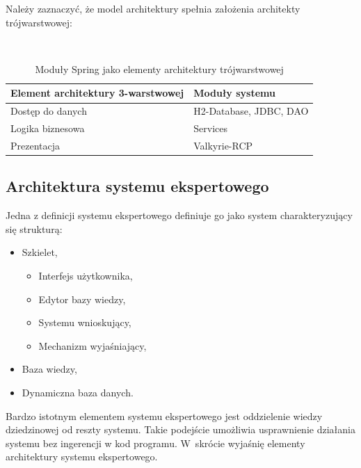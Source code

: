 Należy zaznaczyć, że model architektury spełnia założenia architekty trójwarstwowej:
\begin{table}[h]
 \caption{Moduły Spring jako elementy architektury trójwarstwowej}
 \small\tt
 \centering
 \vspace{0in}
 \begin{tabular}{|l|l|}
 \hline
 \textbf{Element architektury 3-warstwowej} & \textbf{Moduły systemu} \\ 
 \hline
 Dostęp do danych & H2-Database, JDBC, DAO \\
 \hline
 Logika biznesowa & Services \\
 \hline
 Prezentacja & Valkyrie-RCP \\
 \hline
 \end{tabular}
\end{table}

\subsection{Architektura systemu ekspertowego}
\label{sec:architekturaSystemuEkspertowego}
Jedna z definicji systemu ekspertowego definiuje go jako system charakteryzujący się strukturą\cite{goluchowski_eskpertowe}:
\begin{itemize}
 \item 	Szkielet,
       \begin{itemize}
	 \item Interfejs użytkownika,
	 \item Edytor bazy wiedzy,
	 \item Systemu wnioskujący,
	 \item Mechanizm wyjaśniający,
       \end{itemize}
 \item Baza wiedzy,
 \item Dynamiczna baza danych.
\end{itemize}

Bardzo istotnym elementem systemu ekspertowego jest oddzielenie wiedzy dziedzinowej od reszty systemu. Takie podejście umożliwia usprawnienie działania systemu bez ingerencji w kod programu. W~skrócie wyjaśnię elementy architektury systemu ekspertowego.

